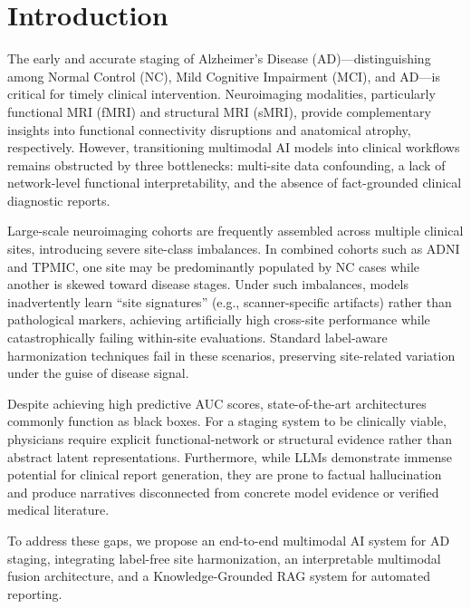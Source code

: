 \documentclass[conference]{IEEEtran}
\begin{document}
\section{Introduction}

The early and accurate staging of Alzheimer's Disease (AD)---distinguishing among Normal Control (NC), Mild Cognitive Impairment (MCI), and AD---is critical for timely clinical intervention. Neuroimaging modalities, particularly functional MRI (fMRI) and structural MRI (sMRI), provide complementary insights into functional connectivity disruptions and anatomical atrophy, respectively. However, transitioning multimodal AI models into clinical workflows remains obstructed by three bottlenecks: multi-site data confounding, a lack of network-level functional interpretability, and the absence of fact-grounded clinical diagnostic reports.

Large-scale neuroimaging cohorts are frequently assembled across multiple clinical sites, introducing severe site-class imbalances. In combined cohorts such as ADNI and TPMIC, one site may be predominantly populated by NC cases while another is skewed toward disease stages. Under such imbalances, models inadvertently learn ``site signatures'' (e.g., scanner-specific artifacts) rather than pathological markers, achieving artificially high cross-site performance while catastrophically failing within-site evaluations. Standard label-aware harmonization techniques fail in these scenarios, preserving site-related variation under the guise of disease signal.

Despite achieving high predictive AUC scores, state-of-the-art architectures commonly function as black boxes. For a staging system to be clinically viable, physicians require explicit functional-network or structural evidence rather than abstract latent representations. Furthermore, while LLMs demonstrate immense potential for clinical report generation, they are prone to factual hallucination \cite{ji2023hallucination} and produce narratives disconnected from concrete model evidence or verified medical literature.

To address these gaps, we propose an end-to-end multimodal AI system for AD staging, integrating label-free site harmonization, an interpretable multimodal fusion architecture, and a Knowledge-Grounded RAG system for automated reporting.
\end{document}
